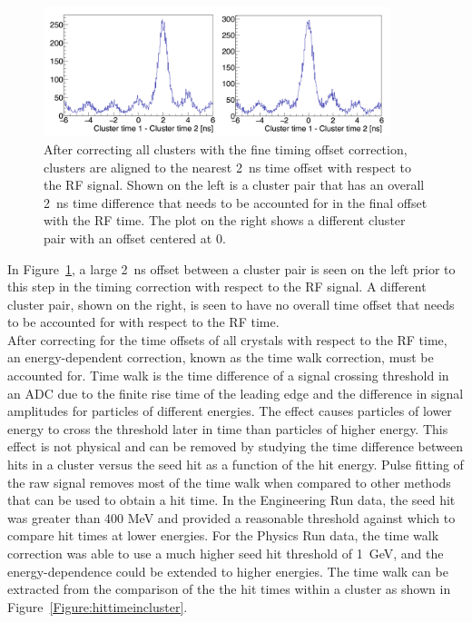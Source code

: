\begin{figure}[H]
  \centering
      \includegraphics[width=0.9\textwidth]{pics/performance/2clusteroffset.png}
  \caption[Time difference between two clusters after fine offset time correction]{After correcting all clusters with the fine timing offset correction, clusters are aligned to the nearest 2~ns time offset with respect to the RF signal. Shown on the left is a cluster pair that has an overall 2~ns time difference that needs to be accounted for in the final offset with the RF time. The plot on the right shows a different cluster pair with an offset centered at 0.}
  \label{Figure:2clusoffset}
\end{figure}

In Figure~\ref{Figure:2clusoffset}, a large 2~ns offset between a cluster pair is seen on the left prior to this step in the timing correction with respect to the RF signal. A different cluster pair, shown on the right, is seen to have no overall time offset that needs to be accounted for with respect to the RF time. \\
\indent After correcting for the time offsets of all crystals with respect to the RF time, an energy-dependent correction, known as the time walk correction, must be accounted for. Time walk is the time difference of a signal crossing threshold in an ADC due to the finite rise time of the leading edge and the difference in signal amplitudes for particles of different energies. The effect causes particles of lower energy to cross the threshold later in time than particles of higher energy. This effect is not physical and can be removed by studying the time difference between hits in a cluster versus the seed hit as a function of the hit energy. Pulse fitting of the raw signal removes most of the time walk when compared to other methods that can be used to obtain a hit time. In the Engineering Run data, the seed hit was greater than 400 MeV and provided a reasonable threshold against which to compare hit times at lower energies. For the Physics Run data, the time walk correction was able to use a much higher seed hit threshold of 1~GeV, and the energy-dependence could be extended to higher energies. The time walk can be extracted from the comparison of the the hit times within a cluster as shown in Figure~\ref{Figure:hittimeincluster}.

